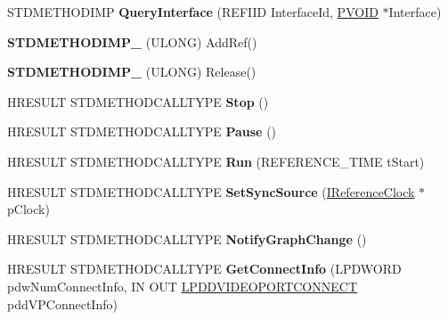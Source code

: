 \begin{DoxyCompactItemize}
\item 
\mbox{\label{class_c_v_p_config_ab4c0b55bd33e7a36081c60eef25be1b0}} 
S\+T\+D\+M\+E\+T\+H\+O\+D\+I\+MP {\bfseries Query\+Interface} (R\+E\+F\+I\+ID Interface\+Id, \hyperlink{interfacevoid}{P\+V\+O\+ID} $\ast$Interface)
\item 
\mbox{\label{class_c_v_p_config_a8abb48c37158e34abb9ab294bce3604c}} 
{\bfseries S\+T\+D\+M\+E\+T\+H\+O\+D\+I\+M\+P\+\_\+} (U\+L\+O\+NG) Add\+Ref()
\item 
\mbox{\label{class_c_v_p_config_ab28346a72c8ea4efebc4722f9730982e}} 
{\bfseries S\+T\+D\+M\+E\+T\+H\+O\+D\+I\+M\+P\+\_\+} (U\+L\+O\+NG) Release()
\item 
\mbox{\label{class_c_v_p_config_ad14508f941da88dab77650efc649f38a}} 
H\+R\+E\+S\+U\+LT S\+T\+D\+M\+E\+T\+H\+O\+D\+C\+A\+L\+L\+T\+Y\+PE {\bfseries Stop} ()
\item 
\mbox{\label{class_c_v_p_config_a10eadd46ade6b9ed7b3f2f09c2d8269e}} 
H\+R\+E\+S\+U\+LT S\+T\+D\+M\+E\+T\+H\+O\+D\+C\+A\+L\+L\+T\+Y\+PE {\bfseries Pause} ()
\item 
\mbox{\label{class_c_v_p_config_a0a532b31c14ad9c42ba7f0156bd5868c}} 
H\+R\+E\+S\+U\+LT S\+T\+D\+M\+E\+T\+H\+O\+D\+C\+A\+L\+L\+T\+Y\+PE {\bfseries Run} (R\+E\+F\+E\+R\+E\+N\+C\+E\+\_\+\+T\+I\+ME t\+Start)
\item 
\mbox{\label{class_c_v_p_config_a65a4a359a7ec30ede7083076771a0e4a}} 
H\+R\+E\+S\+U\+LT S\+T\+D\+M\+E\+T\+H\+O\+D\+C\+A\+L\+L\+T\+Y\+PE {\bfseries Set\+Sync\+Source} (\hyperlink{interface_i_reference_clock}{I\+Reference\+Clock} $\ast$p\+Clock)
\item 
\mbox{\label{class_c_v_p_config_ae56e9fbe82e1d8649568aedde217e321}} 
H\+R\+E\+S\+U\+LT S\+T\+D\+M\+E\+T\+H\+O\+D\+C\+A\+L\+L\+T\+Y\+PE {\bfseries Notify\+Graph\+Change} ()
\item 
\mbox{\label{class_c_v_p_config_aae8025aa738facec65491bbbfe453ab7}} 
H\+R\+E\+S\+U\+LT S\+T\+D\+M\+E\+T\+H\+O\+D\+C\+A\+L\+L\+T\+Y\+PE {\bfseries Get\+Connect\+Info} (L\+P\+D\+W\+O\+RD pdw\+Num\+Connect\+Info, IN O\+UT \hyperlink{struct___d_d_v_i_d_e_o_p_o_r_t_c_o_n_n_e_c_t}{L\+P\+D\+D\+V\+I\+D\+E\+O\+P\+O\+R\+T\+C\+O\+N\+N\+E\+CT} pdd\+V\+P\+Connect\+Info)

\end{DoxyCompactItemize}
